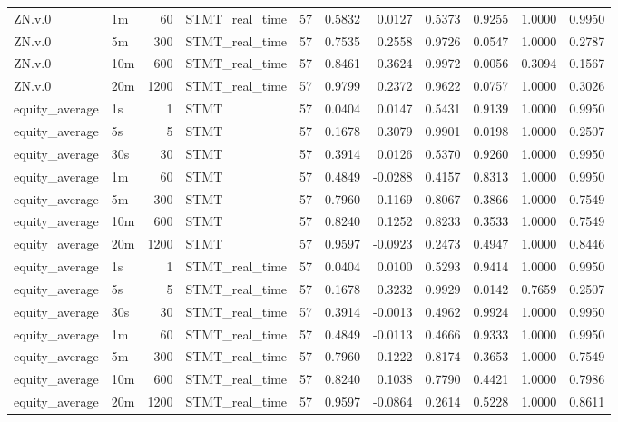 \begin{tabular}{llrlrrrrrrr}
ZN.v.0 & 1m & 60 & STMT_real_time & 57 & 0.5832 & 0.0127 & 0.5373 & 0.9255 & 1.0000 & 0.9950 \\
ZN.v.0 & 5m & 300 & STMT_real_time & 57 & 0.7535 & 0.2558 & 0.9726 & 0.0547 & 1.0000 & 0.2787 \\
ZN.v.0 & 10m & 600 & STMT_real_time & 57 & 0.8461 & 0.3624 & 0.9972 & 0.0056 & 0.3094 & 0.1567 \\
ZN.v.0 & 20m & 1200 & STMT_real_time & 57 & 0.9799 & 0.2372 & 0.9622 & 0.0757 & 1.0000 & 0.3026 \\
equity_average & 1s & 1 & STMT & 57 & 0.0404 & 0.0147 & 0.5431 & 0.9139 & 1.0000 & 0.9950 \\
equity_average & 5s & 5 & STMT & 57 & 0.1678 & 0.3079 & 0.9901 & 0.0198 & 1.0000 & 0.2507 \\
equity_average & 30s & 30 & STMT & 57 & 0.3914 & 0.0126 & 0.5370 & 0.9260 & 1.0000 & 0.9950 \\
equity_average & 1m & 60 & STMT & 57 & 0.4849 & -0.0288 & 0.4157 & 0.8313 & 1.0000 & 0.9950 \\
equity_average & 5m & 300 & STMT & 57 & 0.7960 & 0.1169 & 0.8067 & 0.3866 & 1.0000 & 0.7549 \\
equity_average & 10m & 600 & STMT & 57 & 0.8240 & 0.1252 & 0.8233 & 0.3533 & 1.0000 & 0.7549 \\
equity_average & 20m & 1200 & STMT & 57 & 0.9597 & -0.0923 & 0.2473 & 0.4947 & 1.0000 & 0.8446 \\
equity_average & 1s & 1 & STMT_real_time & 57 & 0.0404 & 0.0100 & 0.5293 & 0.9414 & 1.0000 & 0.9950 \\
equity_average & 5s & 5 & STMT_real_time & 57 & 0.1678 & 0.3232 & 0.9929 & 0.0142 & 0.7659 & 0.2507 \\
equity_average & 30s & 30 & STMT_real_time & 57 & 0.3914 & -0.0013 & 0.4962 & 0.9924 & 1.0000 & 0.9950 \\
equity_average & 1m & 60 & STMT_real_time & 57 & 0.4849 & -0.0113 & 0.4666 & 0.9333 & 1.0000 & 0.9950 \\
equity_average & 5m & 300 & STMT_real_time & 57 & 0.7960 & 0.1222 & 0.8174 & 0.3653 & 1.0000 & 0.7549 \\
equity_average & 10m & 600 & STMT_real_time & 57 & 0.8240 & 0.1038 & 0.7790 & 0.4421 & 1.0000 & 0.7986 \\
equity_average & 20m & 1200 & STMT_real_time & 57 & 0.9597 & -0.0864 & 0.2614 & 0.5228 & 1.0000 & 0.8611 \\
\bottomrule
\end{tabular}
